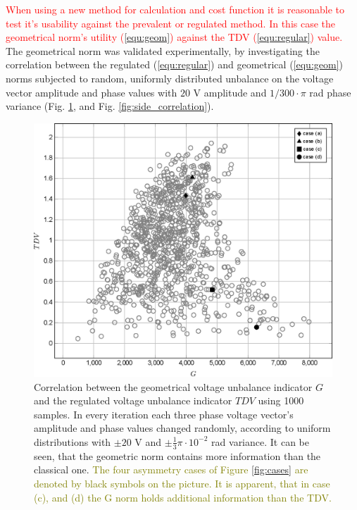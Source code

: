             \textcolor{red}{When using a new method for calculation and cost function it is reasonable to test it's usability against the prevalent or regulated method. In this case the geometrical norm's utility (\ref{equ:geom}) against the TDV (\ref{equ:regular}) value. }
            The geometrical norm was validated experimentally, by investigating the correlation between the regulated (\ref{equ:regular})  and geometrical (\ref{equ:geom}) norms subjected to random, uniformly distributed unbalance on the voltage vector amplitude and phase values with $20$ V amplitude and $1/300\cdot\pi$ rad phase variance (Fig. \ref{fig:correlation}, and Fig. \ref{fig:side_correlation}).

            \begin{figure}[!ht]
           \centering
           \includegraphics[width=\textwidth,scale=0.95]{Unblance_EPS_Pics/EPS_images/scatter.eps}
           \caption{Correlation between the geometrical voltage unbalance indicator $G$ and the regulated voltage unbalance indicator $TDV$ using 1000 samples. In every iteration each three phase voltage vector's amplitude and phase values changed randomly, according to uniform distributions with $\pm20$ V and $\pm\frac{1}{3}\pi\cdot10^{-2}$ rad variance. It can be seen, that the geometric norm contains more information than the classical one. \textcolor{olive}{The  four asymmetry cases of Figure \ref{fig:cases} are denoted by black symbols on the picture. It is apparent, that in case (c), and (d) the G norm holds additional information than the TDV.}}
           \label{fig:correlation}
            \end{figure}

